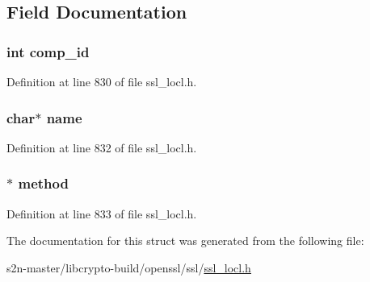 \subsection{Field Documentation}
\subsubsection[{\texorpdfstring{comp\+\_\+id}{comp_id}}]{\setlength{\rightskip}{0pt plus 5cm}int comp\+\_\+id}\hypertarget{structssl3__comp__st_af43d634bfe573ddfbc79db2baa15409f}{}\label{structssl3__comp__st_af43d634bfe573ddfbc79db2baa15409f}


Definition at line 830 of file ssl\+\_\+locl.\+h.

\subsubsection[{\texorpdfstring{name}{name}}]{\setlength{\rightskip}{0pt plus 5cm}char$\ast$ name}\hypertarget{structssl3__comp__st_a5ac083a645d964373f022d03df4849c8}{}\label{structssl3__comp__st_a5ac083a645d964373f022d03df4849c8}


Definition at line 832 of file ssl\+\_\+locl.\+h.

\subsubsection[{\texorpdfstring{method}{method}}]{$\ast$ method}\hypertarget{structssl3__comp__st_a07809985d67be99453d6b52cfc6b57e1}{}\label{structssl3__comp__st_a07809985d67be99453d6b52cfc6b57e1}


Definition at line 833 of file ssl\+\_\+locl.\+h.



The documentation for this struct was generated from the following file\+:\begin{DoxyCompactItemize}
\item 
s2n-\/master/libcrypto-\/build/openssl/ssl/\hyperlink{ssl__locl_8h}{ssl\+\_\+locl.\+h}\end{DoxyCompactItemize}
